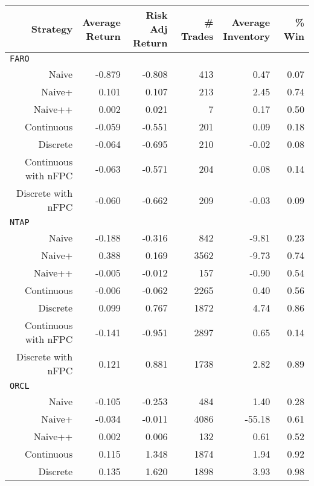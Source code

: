 \begin{table}
\centering
{}
\setlength{\tabcolsep}{9pt}
\begin{tabular}{@{} *{6}{r} @{}}
\toprule
Strategy & \cellbreak{t}{r}{Average \\ Return} & \cellbreak{t}{r}{Risk Adj \\ Return} & \cellbreak{t}{r}{\# Trades \\ \hphantom{Risk Adj}} & \cellbreak{t}{r}{Average \\ Inventory} & \cellbreak{t}{r}{\% Win \\ \hphantom{Risk Adj}} \\
\midrule
\multicolumn{6}{l}{\texttt{FARO}} \\
Naive & -0.879 & -0.808 & 413 & 0.47 & 0.07  \\ 
Naive+ & 0.101 & 0.107 & 213 & 2.45 & 0.74  \\ 
Naive++ & 0.002 & 0.021 & 7 & 0.17 & 0.50  \\ 
Continuous & -0.059 & -0.551 & 201 & 0.09 & 0.18  \\ 
Discrete & -0.064 & -0.695 & 210 & -0.02 & 0.08  \\ 
Continuous with nFPC & -0.063 & -0.571 & 204 & 0.08 & 0.14  \\ 
Discrete with nFPC & -0.060 & -0.662 & 209 & -0.03 & 0.09  \\[2ex]
\multicolumn{6}{l}{\texttt{NTAP}} \\
Naive & -0.188 & -0.316 & 842 & -9.81 & 0.23 \\ 
Naive+ & 0.388 & 0.169 & 3562 & -9.73 & 0.74 \\ 
Naive++ & -0.005 & -0.012 & 157 & -0.90 & 0.54  \\ 
Continuous & -0.006 & -0.062 & 2265 & 0.40 & 0.56  \\ 
Discrete & 0.099 & 0.767 & 1872 & 4.74 & 0.86  \\ 
Continuous with nFPC & -0.141 & -0.951 & 2897 & 0.65 & 0.14 \\ 
Discrete with nFPC & 0.121 & 0.881 & 1738 & 2.82 & 0.89  \\[2ex]
\multicolumn{6}{l}{\texttt{ORCL}} \\
Naive & -0.105 & -0.253 & 484 & 1.40 & 0.28  \\ 
Naive+ & -0.034 & -0.011 & 4086 & -55.18 & 0.61 \\ 
Naive++ & 0.002 & 0.006 & 132 & 0.61 & 0.52 \\ 
Continuous & 0.115 & 1.348 & 1874 & 1.94 & 0.92 \\ 
Discrete & 0.135 & 1.620 & 1898 & 3.93 & 0.98 \\ 

\end{tabular}
\end{table}
